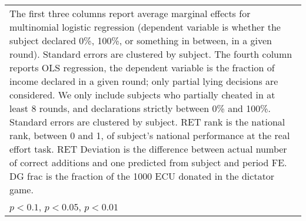 \begin{tabular}{l|cccccc|cc}
\hline\hline
\multicolumn{9}{p{16cm}}{\tiny The first three columns report average marginal effects for multinomial logistic regression (dependent variable is whether the subject declared 0\%, 100\%, or something in between, in a given round). Standard errors are clustered by subject. The fourth column reports OLS regression, the dependent variable is the fraction of income declared in a given round; only partial lying decisions are considered. We only include subjects who partially cheated in at least 8 rounds, and declarations strictly between 0\% and 100\%. Standard errors are clustered by subject. RET rank is the national rank, between 0 and 1, of subject's national performance at the real effort task. RET Deviation is the difference between actual number of correct additions and one predicted from subject and period FE. DG frac is the fraction of the 1000 ECU donated in the dictator game.}\\
\multicolumn{9}{l}{\tiny \sym{*} \(p<0.1\), \sym{**} \(p<0.05\), \sym{***} \(p<0.01\)}\\
\end{tabular}